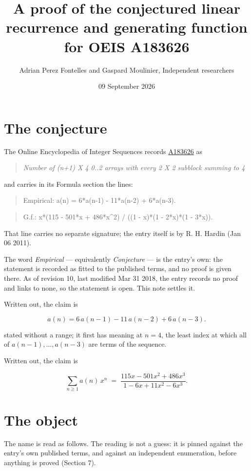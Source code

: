 \documentclass[11pt]{article}
\title{A proof of the conjectured linear recurrence and generating function for OEIS A183626}
\author{Adrian Perez Fontelles and Gaspard Moulinier, Independent researchers}
\date{09 September 2026}
\theoremstyle{definition}
\begin{document}
\maketitle
\section{The conjecture}

The Online Encyclopedia of Integer Sequences records \href{https://oeis.org/A183626}{A183626} as

\begin{quote}\itshape Number of (n+1) X 4 0..2 arrays with every 2 X 2 subblock summing to 4\end{quote}

and carries in its Formula section the lines:

\begin{quote}\ttfamily Empirical: a(n) = 6*a(n-1) - 11*a(n-2) + 6*a(n-3).\end{quote}

\begin{quote}\ttfamily G.f.: x*(115 - 501*x + 486*x\textasciicircum{}2) / ((1 - x)*(1 - 2*x)*(1 - 3*x)).\end{quote}

That line carries no separate signature; the entry itself is by R. H. Hardin (Jan 06 2011).

The word {\itshape Empirical} --- equivalently {\itshape Conjecture} --- is the entry's own: the statement is recorded as fitted to the published terms, and no proof is given there. As of revision 10, last modified Mar 31 2018, the entry records no proof and links to none, so the statement is open. This note settles it.

Written out, the claim is

\[a(n) = 6\,a(n-1) - 11\,a(n-2) + 6\,a(n-3).\]

stated without a range; it first has meaning at $n = 4$, the least index at which all of $a(n-1),\dots,a(n-3)$ are terms of the sequence.

Written out, the claim is

\[\sum_{n \ge 1} a(n)\,x^n \;=\; \frac{115x - 501x^{2} + 486x^{3}}{1 - 6x + 11x^{2} - 6x^{3}}.\]

\section{The object}

The name is read as follows. The reading is not a guess: it is pinned against the entry's own published terms, and against an independent enumeration, before anything is proved (Section 7).
\end{document}
